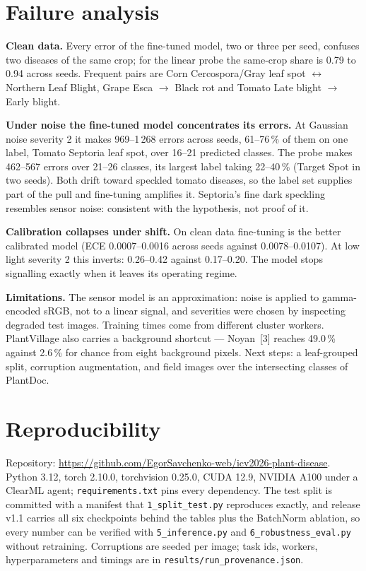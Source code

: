 \documentclass[10pt,a4paper,twocolumn]{article}
\begin{document}
\section{Failure analysis}

\textbf{Clean data.} Every error of the fine-tuned model, two or three per seed, confuses two
diseases of the same crop; for the linear probe the same-crop share is 0.79 to 0.94 across seeds.
Frequent pairs are Corn Cercospora/Gray leaf spot $\leftrightarrow$ Northern Leaf Blight, Grape
Esca $\rightarrow$ Black rot and Tomato Late blight $\rightarrow$ Early blight.

\textbf{Under noise the fine-tuned model concentrates its errors.} At Gaussian noise severity 2 it
makes 969--1\,268 errors across seeds, 61--76\,\% of them on one label, Tomato Septoria leaf spot,
over 16--21 predicted classes. The probe makes 462--567 errors over 21--26 classes, its largest
label taking 22--40\,\% (Target Spot in two seeds). Both drift toward speckled tomato diseases, so
the label set supplies part of the pull and fine-tuning amplifies it. Septoria's fine dark
speckling resembles sensor noise: consistent with the hypothesis, not proof of it.

\textbf{Calibration collapses under shift.} On clean data fine-tuning is the better calibrated model
(ECE 0.0007--0.0016 across seeds against 0.0078--0.0107). At low light severity 2 this inverts:
0.26--0.42 against 0.17--0.20. The model stops signalling exactly when it leaves its operating regime.

\textbf{Limitations.} The sensor model is an approximation: noise is applied to gamma-encoded sRGB,
not to a linear signal, and severities were chosen by inspecting degraded test images. Training times come from different cluster workers.
PlantVillage also carries a background shortcut --- Noyan~[3] reaches 49.0\,\% against
2.6\,\% for chance from eight background pixels. Next steps: a leaf-grouped split, corruption
augmentation, and field images over the intersecting classes of PlantDoc.

\section{Reproducibility}

Repository: \url{https://github.com/EgorSavchenko-web/icv2026-plant-disease}.
Python 3.12, torch 2.10.0, torchvision 0.25.0, CUDA 12.9, NVIDIA A100 under a ClearML agent;
\texttt{requirements.txt} pins every dependency. The test split is committed with a manifest that
\texttt{1\_split\_test.py} reproduces exactly, and release v1.1 carries all six checkpoints behind the
tables plus the BatchNorm ablation, so every number can be verified with \texttt{5\_inference.py} and
\texttt{6\_robustness\_eval.py} without retraining. Corruptions are seeded per image; task ids, workers,
hyperparameters and timings are in \texttt{results/run\_provenance.json}.
\end{document}
